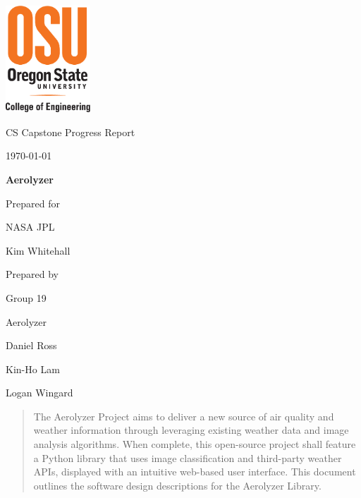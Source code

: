 \documentclass[onecolumn, draftclsnofoot,10pt, compsoc]{IEEEtran}
\def \CapstoneTeamName{		Aerolyzer}
\def \CapstoneTeamNumber{		19}
\def \GroupMemberOne{			Daniel Ross}
\def \GroupMemberTwo{			Kin-Ho Lam}
\def \GroupMemberThree{			Logan Wingard}
\def \CapstoneProjectName{		Aerolyzer}
\def \CapstoneSponsorCompany{	NASA JPL}
\def \CapstoneSponsorPerson{		Kim Whitehall}
\def \DocType{		%
	Progress Report
}
\newcommand{\NameSigPair}[1]{\par
	\makebox[2.75in][r]{#1} \hfil 	\makebox[3.25in]{\makebox[2.25in]{\hrulefill} \hfill		\makebox[.75in]{\hrulefill}}
	\par\vspace{-12pt} \textit{\tiny\noindent
		\makebox[2.75in]{} \hfil		\makebox[3.25in]{\makebox[2.25in][r]{Signature} \hfill	\makebox[.75in][r]{Date}}}}
\renewcommand{\NameSigPair}[1]{#1}
\begin{document}
	\begin{titlepage}
		\begin{singlespace}
			\centering
			\includegraphics[height=4cm,natwidth=345,natheight=435]{images/coe_v_spot1.png}
			\hfill 
			\par\vspace{.2in}
			\centering
			\scshape{
				\huge CS Capstone \DocType \par
				{\large\today}\par
				\vspace{.5in}
				\textbf{\Huge\CapstoneProjectName}\par
				\vfill
				{\large Prepared for}\par
				\Huge \CapstoneSponsorCompany\par
				\vspace{5pt}
				{\Large\NameSigPair{\CapstoneSponsorPerson}\par}
				{\large Prepared by }\par
				Group\CapstoneTeamNumber\par
				\CapstoneTeamName\par 
				\vspace{5pt}
				{\large
					\NameSigPair{\GroupMemberOne}\par
					\NameSigPair{\GroupMemberTwo}\par
					\NameSigPair{\GroupMemberThree}\par
				}
				\vspace{20pt}
			}
			\begin{abstract}  
				The Aerolyzer Project aims to deliver a new source of air quality and weather information through leveraging existing weather data and image analysis algorithms.
				When complete, this open-source project shall feature a Python library that uses image classification and third-party weather APIs, displayed with an intuitive web-based user interface.
				This document outlines the software design descriptions for the Aerolyzer Library. 
			\end{abstract}     
		\end{singlespace}
	\end{titlepage}
\end{document}
